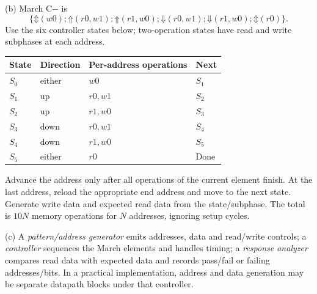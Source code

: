 \documentclass[11pt]{article}
\newcommand{\up}{\mathord{\Uparrow}}
\newcommand{\dn}{\mathord{\Downarrow}}
\newcommand{\any}{\mathord{\Updownarrow}}
\begin{document}
(b) March C$-$ is
\[
\{\any(w0);\up(r0,w1);\up(r1,w0);
  \dn(r0,w1);\dn(r1,w0);\any(r0)\}.
\]
Use the six controller states below; two-operation states have read and write
subphases at each address.
\begin{center}\begin{tabular}{llll}\toprule State & Direction & Per-address operations & Next\\\midrule
$S_0$ & either & $w0$ & $S_1$\\
$S_1$ & up & $r0,w1$ & $S_2$\\
$S_2$ & up & $r1,w0$ & $S_3$\\
$S_3$ & down & $r0,w1$ & $S_4$\\
$S_4$ & down & $r1,w0$ & $S_5$\\
$S_5$ & either & $r0$ & Done\\\bottomrule
\end{tabular}\end{center}
Advance the address only after all operations of the current element finish.
At the last address, reload the appropriate end address and move to the next
state. Generate write data and expected read data from the state/subphase.
The total is $10N$ memory operations for $N$ addresses, ignoring setup cycles.

(c) A \emph{pattern/address generator} emits addresses, data and read/write
controls; a \emph{controller} sequences the March elements and handles timing;
a \emph{response analyzer} compares read data with expected data and records
pass/fail or failing addresses/bits. In a practical implementation, address and
data generation may be separate datapath blocks under that controller.
\end{document}
